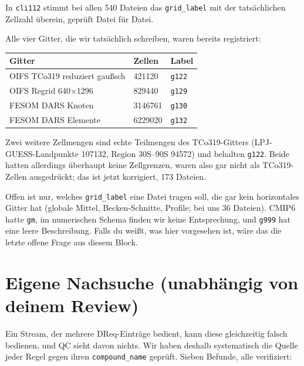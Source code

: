 \documentclass[11pt,a4paper]{article}
\newcommand{\code}[1]{\texttt{\small #1}}
\begin{document}
In \code{cli112} stimmt bei allen 540 Dateien das \code{grid\_label} mit der
tats\"achlichen Zellzahl \"uberein, gepr\"uft Datei f\"ur Datei.

Alle vier Gitter, die wir tats\"achlich schreiben, waren bereits registriert:

\begin{center}
\begin{tabular}{lll}
\toprule
\textbf{Gitter} & \textbf{Zellen} & \textbf{Label} \\
\midrule
OIFS TCo319 reduziert gau\ss sch & 421120 & \code{g122} \\
OIFS Regrid 640$\times$1296 & 829440 & \code{g129} \\
FESOM DARS Knoten & 3146761 & \code{g130} \\
FESOM DARS Elemente & 6229020 & \code{g132} \\
\bottomrule
\end{tabular}
\end{center}

Zwei weitere Zellmengen sind echte Teilmengen des TCo319-Gitters (LPJ-GUESS-Landpunkte
107132, Region 30S--90S 94572) und behalten \code{g122}. Beide hatten allerdings
\"uberhaupt keine Zellgrenzen, waren also gar nicht als TCo319-Zellen ausgedr\"uckt;
das ist jetzt korrigiert, 173 Dateien.

Offen ist nur, welches \code{grid\_label} eine Datei tragen soll, die gar kein
horizontales Gitter hat (globale Mittel, Becken-Schnitte, Profile; bei uns 36
Dateien). CMIP6 hatte \code{gm}, im numerischen Schema finden wir keine Entsprechung,
und \code{g999} hat eine leere Beschreibung. Falls du wei\ss t, was hier vorgesehen
ist, w\"are das die letzte offene Frage aus diesem Block.

\section{Eigene Nachsuche (unabh\"angig von deinem Review)}

Ein Stream, der mehrere DReq-Eintr\"age bedient, kann diese gleichzeitig falsch
bedienen, und QC sieht davon nichts. Wir haben deshalb systematisch die Quelle jeder
Regel gegen ihren \code{compound\_name} gepr\"uft. Sieben Befunde, alle verifiziert:
\end{document}
